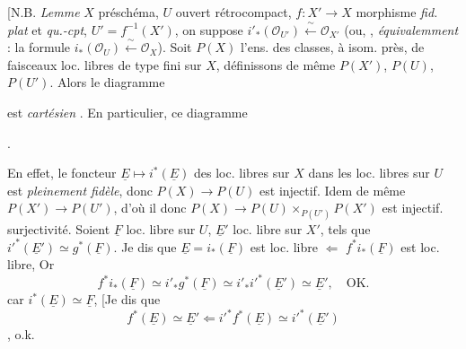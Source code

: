 \documentclass[11pt,a4paper]{article}
\begin{document}

[N.B. \emph{Lemme} $X$ préschéma, $U$ ouvert rétrocompact, $f\colon X'\to X$ morphisme
\emph{fid. plat} et \emph{qu.-cpt}, $U'=f^{-1}(X')$, on
suppose $i'_*(\mathcal{O}_{U'})\xleftarrow{\ \sim\ }\mathcal{O}_{X'}$ (ou, \ill{},
\emph{équivalemment} : la formule $i_*(\mathcal{O}_U)\xleftarrow{\ \sim\ }\mathcal{O}_X$).
Soit $P(X)$ l'ens. des classes, à isom. près, de faisceaux loc. libres de type fini sur
$X$, définissons de même $P(X')$, $P(U)$, $P(U')$. Alors le diagramme


est \emph{cartésien} \struck{\ill{}}. En particulier, ce diagramme


 \emph{}.


En effet, \struck{\ill{}} le foncteur $\underline{E}\mapsto i^*(\underline{E})$ des
 loc. libres sur $X$ dans les  loc. libres sur $U$
est \emph{pleinement fidèle}, donc $P(X)\to P(U)$ est injectif. Idem de même
$P(X')\to P(U')$, d'où il \ill{} donc $P(X)\to P(U)\times_{P(U')}P(X')$ est injectif.
  surjectivité. Soient $\underline{F}$ loc. libre
sur $U$, $\underline{E}'$ loc. libre sur $X'$, tels que
$i'^*(\underline{E}')\simeq g^*(\underline{F})$. Je dis que $\underline{E}=i_*(\underline{F})$
est loc. libre $\Longleftarrow$  $f^*i_*(\underline{F})$ est loc.
libre, Or
\[
f^*i_*(\underline{F})\simeq i'_*g^*(\underline{F})\simeq i'_*i'^*(\underline{E}')
\simeq\underline{E}' , \quad \text{OK.}
\]
car $i^*(\underline{E})\simeq\underline{F}$, [Je dis que
\[
f^*(\underline{E})\simeq\underline{E}' \Longleftarrow
i'^*f^*(\underline{E})\simeq i'^*(\underline{E}')
\]
,
o.k.
\end{document}
